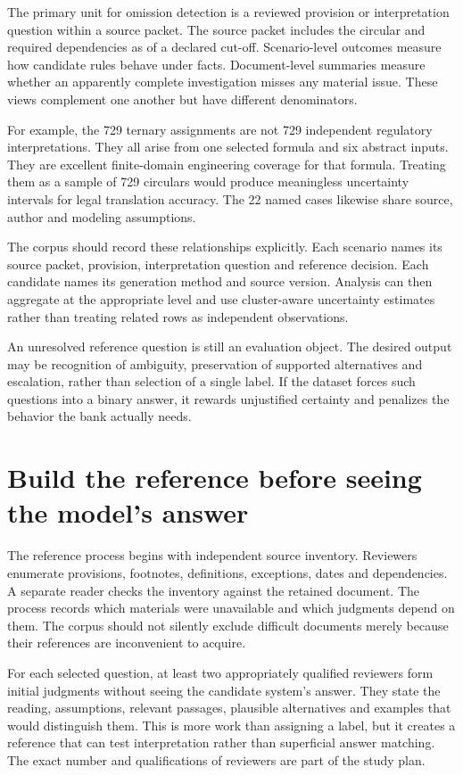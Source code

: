 \documentclass[12pt,a4paper,oneside,openany]{book}
\begin{document}
The primary unit for omission detection is a reviewed provision or interpretation
question within a source packet. The source packet includes the circular and
required dependencies as of a declared cut-off. Scenario-level outcomes measure
how candidate rules behave under facts. Document-level summaries measure whether
an apparently complete investigation misses any material issue. These views
complement one another but have different denominators.

For example, the 729 ternary assignments are not 729 independent regulatory
interpretations. They all arise from one selected formula and six abstract inputs.
They are excellent finite-domain engineering coverage for that formula. Treating
them as a sample of 729 circulars would produce meaningless uncertainty intervals
for legal translation accuracy. The 22 named cases likewise share source,
author and modeling assumptions.

The corpus should record these relationships explicitly. Each scenario names its
source packet, provision, interpretation question and reference decision. Each
candidate names its generation method and source version. Analysis can then
aggregate at the appropriate level and use cluster-aware uncertainty estimates
rather than treating related rows as independent observations.

An unresolved reference question is still an evaluation object. The desired
output may be recognition of ambiguity, preservation of supported alternatives
and escalation, rather than selection of a single label. If the dataset forces
such questions into a binary answer, it rewards unjustified certainty and
penalizes the behavior the bank actually needs.

\section{Build the reference before seeing the model's answer}
\label{merge:M09:02}


The reference process begins with independent source inventory. Reviewers enumerate
provisions, footnotes, definitions, exceptions, dates and dependencies. A separate
reader checks the inventory against the retained document. The process records
which materials were unavailable and which judgments depend on them. The corpus
should not silently exclude difficult documents merely because their references
are inconvenient to acquire.

For each selected question, at least two appropriately qualified reviewers form
initial judgments without seeing the candidate system's answer. They state the
reading, assumptions, relevant passages, plausible alternatives and examples that
would distinguish them. This is more work than assigning a label, but it creates
a reference that can test interpretation rather than superficial answer matching.
The exact number and qualifications of reviewers are part of the study plan.
\end{document}
